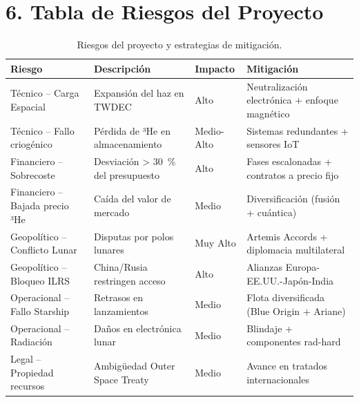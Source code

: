 \documentclass[11pt,a4paper]{article}
\begin{document}
\section{6. Tabla de Riesgos del Proyecto}
\begin{table}[H]
\centering
\small
\begin{tabularx}{\textwidth}{l X X X}
\toprule
\textbf{Riesgo} & \textbf{Descripción} & \textbf{Impacto} & \textbf{Mitigación} \\
\midrule
Técnico -- Carga Espacial & Expansión del haz en TWDEC & Alto & Neutralización electrónica + enfoque magnético \\
Técnico -- Fallo criogénico & Pérdida de ³He en almacenamiento & Medio-Alto & Sistemas redundantes + sensores IoT \\
Financiero -- Sobrecoste & Desviación > \SI{30}{\percent} del presupuesto & Alto & Fases escalonadas + contratos a precio fijo \\
Financiero -- Bajada precio ³He & Caída del valor de mercado & Medio & Diversificación (fusión + cuántica) \\
Geopolítico -- Conflicto Lunar & Disputas por polos lunares & Muy Alto & Artemis Accords + diplomacia multilateral \\
Geopolítico -- Bloqueo ILRS & China/Rusia restringen acceso & Alto & Alianzas Europa-EE.UU.-Japón-India \\
Operacional -- Fallo Starship & Retrasos en lanzamientos & Medio & Flota diversificada (Blue Origin + Ariane) \\
Operacional -- Radiación & Daños en electrónica lunar & Medio & Blindaje + componentes rad-hard \\
Legal -- Propiedad recursos & Ambigüedad Outer Space Treaty & Medio & Avance en tratados internacionales \\
\bottomrule
\end{tabularx}
\caption{Riesgos del proyecto y estrategias de mitigación.}
\end{table}
\end{document}
